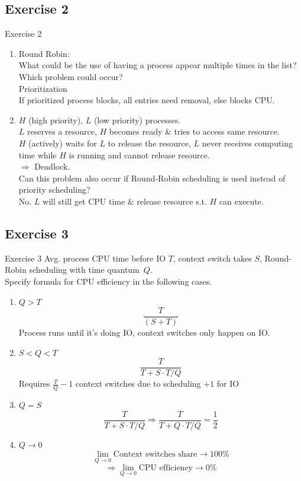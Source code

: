 \documentclass[10pt]{beamer}
\begin{document}
\subsection*{Exercise 2}
\frame{\subsectionpage}
\begin{frame}{Exercise 2}
\begin{enumerate}
		\item%
            Round Robin: \\
			What could be the use of having a process appear multiple times in the list? \\
			Which problem could occur? \\
			\alert{Prioritization \\
                    If prioritized process blocks, all entries need removal, else blocks CPU.}
                    \framebreak
		\item%
			$H$ (high priority), $L$ (low priority) processes. \\
			$L$ reserves a resource, $H$ becomes ready \& tries to access same resource. \\
			$H$ (actively) waits for $L$ to release the resource, $L$ never receives computing time while $H$ is running and cannot release resource.\\ $\Rightarrow$ Deadlock. \\
			Can this problem also occur if Round-Robin scheduling is used instead of priority scheduling? \\
			\alert{No. $L$ will still get CPU time \& release resource s.t. $H$ can execute.}
	\end{enumerate}
\end{frame}

\subsection*{Exercise 3}
\frame{\subsectionpage}
\begin{frame}{Exercise 3}
    Avg. process CPU time before IO $T$, context switch takes $S$, Round-Robin scheduling with time quantum~$Q$. \\ Specify formula for CPU efficiency in the following cases.
	\begin{enumerate}
		\item $Q > T$ \\
		\alert{\[\frac{T}{(S+T)}\]
		Process runs until it's doing IO, context switches only happen on IO.}
		\item $S < Q < T$ \\
		\alert{\[\frac{T}{T + S \cdot T/Q}\]
		Requires $\frac{T}{Q} - 1$ context switches due to scheduling $+ 1$ for IO}
		\framebreak
		\item $Q = S$ \\
		\alert{\[ \frac{T}{T + S \cdot T/Q} \Rightarrow \frac{T}{T + Q \cdot T/Q} = \frac{1}{2}\]}
		\item $Q \rightarrow 0$ \\
		\alert{\[ \lim_{Q \rightarrow 0} \text{Context switches share} \rightarrow 100\%\]
		\[\Rightarrow \lim_{Q \rightarrow 0} \text{CPU efficiency} \rightarrow 0\% \]}
	\end{enumerate}
\end{frame}
\end{document}
